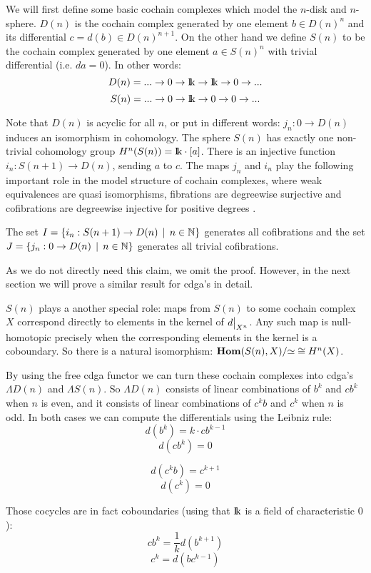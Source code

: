 
We will first define some basic cochain complexes which model the $n$-disk and $n$-sphere. $D(n)$ is the cochain complex generated by one element $b \in D(n)^n$ and its differential $c = d(b) \in D(n)^{n+1}$. On the other hand we define $S(n)$ to be the cochain complex generated by one element $a \in S(n)^n$ with trivial differential (i.e. $d a = 0$). In other words:
$$ D(n) = ... \to 0 \to \mathrm{I\!k} \to \mathrm{I\!k} \to 0 \to ... $$
$$ S(n) = ... \to 0 \to \mathrm{I\!k} \to 0 \to 0 \to ... $$

Note that $D(n)$ is acyclic for all $n$, or put in different words: $j_n : 0 \to D(n)$ induces an isomorphism in cohomology. The sphere $S(n)$ has exactly one non-trivial cohomology group $H^n(S(n)) = \mathrm{I\!k} \cdot [a]$. There is an injective function $i_n : S(n+1) \to D(n)$, sending $a$ to $c$. The maps $j_n$ and $i_n$ play the following important role in the model structure of cochain complexes, where weak equivalences are quasi isomorphisms, fibrations are degreewise surjective and cofibrations are degreewise injective for positive degrees \cite[Example 1.6]{goerss2}.

\begin{claim}
	The set $I = \{i_n : S(n+1) \to D(n) \,\mid\, n \in \mathbb{N}\}$ generates all cofibrations and the set $J = \{j_n : 0 \to D(n) \,\mid\, n \in \mathbb{N}\}$ generates all trivial cofibrations.
\end{claim}

As we do not directly need this claim, we omit the proof. However, in the next section we will prove a similar result for cdga's in detail.

$S(n)$ plays a another special role: maps from $S(n)$ to some cochain complex $X$ correspond directly to elements in the kernel of $\restr{d}{X^n}$. Any such map is null-homotopic precisely when the corresponding elements in the kernel is a coboundary. So there is a natural isomorphism: $\mathbf{Hom}(S(n), X) / {\simeq} \cong H^n(X)$.

By using the free cdga functor we can turn these cochain complexes into cdga's $\Lambda D(n)$ and $\Lambda S(n) $. So $\Lambda D(n)$ consists of linear combinations of $b^k$ and $c b^k$ when $n$ is even, and it consists of linear combinations of $c^k b$ and $c^k$ when $n$ is odd. In both cases we can compute the differentials using the Leibniz rule:
$$ d(b^k) = k \cdot c b^{k-1} $$
$$ d(c b^k) = 0 $$

$$ d(c^k b) = c^{k+1} $$
$$ d(c^k) = 0 $$

Those cocycles are in fact coboundaries (using that $\mathrm{I\!k}$ is a field of characteristic $0$):
$$ c b^k = \frac{1}{k} d(b^{k+1}) $$
$$ c^k = d(b c^{k-1}) $$

